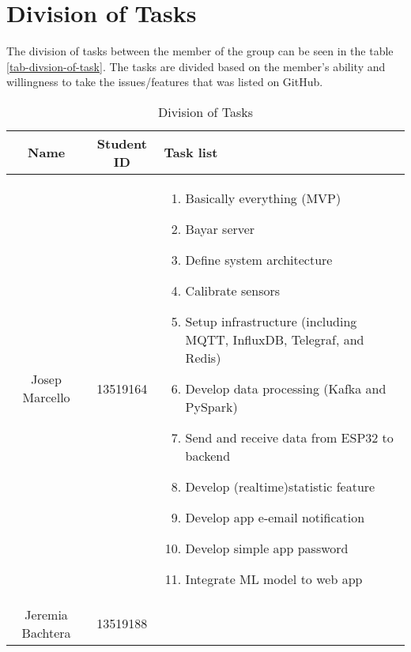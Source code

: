 \section*{Division of Tasks}

The division of tasks between the member of the group can be
seen in the table \ref{tab-divsion-of-task}.
The tasks are divided based on the member's ability and
willingness to take the issues/features that was listed on GitHub.

\begin{table}[htbp]
	\caption{Division of Tasks}
	\begin{center}
		\begin{tabular}{|c|c|p{3cm}|}
			\hline
			\textbf{Name}    & \textbf{Student ID} & \textbf{Task list}                                                        \\
			\hline
			Josep Marcello   & 13519164            & \begin{enumerate}[leftmargin=*]
				                                         \item Basically everything (MVP)
				                                         \item Bayar server
				                                         \item Define system architecture
				                                         \item Calibrate sensors
				                                         \item Setup infrastructure (including MQTT, InfluxDB, Telegraf, and Redis)
				                                         \item Develop data processing (Kafka and PySpark)
				                                         \item Send and receive data from ESP32 to backend
				                                         \item Develop (realtime)statistic feature
				                                         \item Develop app e-email notification
				                                         \item Develop simple app password
				                                         \item Integrate ML model to web app
			                                         \end{enumerate}
			\\
			\hline
			Jeremia Bachtera & 13519188            & \begin{enumerate}[leftmargin=*]

\end{enumerate}
\end{tabular}
\end{center}
\end{table}
